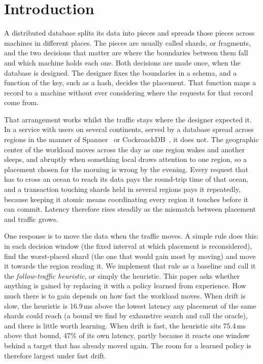 
\section{Introduction}

A distributed database splits its data into pieces and spreads those pieces
across machines in different places. The pieces are usually called shards, or
fragments, and the two decisions that matter are where the boundaries between
them fall and which machine holds each one. Both decisions are made once, when
the database is designed. The designer fixes the boundaries in a schema, and a
function of the key, such as a hash, decides the placement. That function maps a
record to a machine without ever considering where the requests for that record
come from.

That arrangement works whilst the traffic stays where the designer expected it.
In a service with users on several continents, served by a database spread
across regions in the manner of Spanner~\cite{corbett2013spanner} or
CockroachDB~\cite{taft2020cockroachdb}, it does not. The geographic center of
the workload moves across the day as one region wakes and another sleeps, and
abruptly when something local draws attention to one region, so a placement
chosen for the morning is wrong by the evening. Every request that has to cross
an ocean to reach its data pays the round-trip time of that ocean, and a
transaction touching shards held in several regions pays it repeatedly,
because keeping it atomic means coordinating every region it touches before it
can commit. Latency therefore rises steadily as the mismatch between placement
and traffic grows.

One response is to move the data when the traffic moves. A simple rule
does this: in each decision window (the fixed interval at which placement is reconsidered), find the worst-placed shard (the one that would gain most by moving)
and move it towards the region reading it. We implement that rule as a baseline
and call it the \emph{follow-traffic heuristic}, or simply the heuristic. This paper asks whether
anything is gained by replacing it with a policy learned from experience. How much
there is to gain depends on how fast the workload moves. When
drift is slow, the heuristic is 16.9\,ms above the lowest latency any
placement of the same shards could reach (a bound we find by exhaustive search and call the oracle), and there is little worth learning.
When drift is fast, the heuristic sits 75.4\,ms above that bound, 47\% of
its own latency, partly because it reacts one window behind a target that has
already moved again. The room for a learned policy is therefore largest under fast drift.

